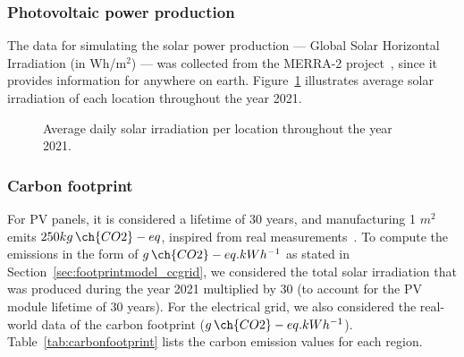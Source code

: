\subsubsection{Photovoltaic power production}

The data for simulating the solar power production --- Global Solar Horizontal Irradiation (in Wh/m$^{2}$) --- was collected from the MERRA-2 project~\cite{GELARO2017MERRA2}, since it provides information for anywhere on earth. Figure~\ref{fig:pv_ghi} illustrates average solar irradiation of each location throughout the year 2021.

 \begin{figure}[!htbp]
  \centering
   {}
  \caption{Average daily solar irradiation per location throughout the year 2021.}
  \label{fig:pv_ghi}
\end{figure}

\subsubsection{Carbon footprint}

For PV panels, it is considered a lifetime of 30 years, and manufacturing 1 $m^2$ emits $250 kg\,\ch{CO2}-eq$, inspired from real measurements~\cite{YUE2014pv_carbon}. To compute the emissions in the form of $g\,\ch{CO2}-eq.kWh^{-1}$ as stated in Section~\ref{sec:footprintmodel_ccgrid}, we considered the total solar irradiation that was produced during the year 2021 multiplied by 30 (to account for the PV module lifetime of 30 years). For the electrical grid, we also considered the real-world data of the carbon footprint ($g\,\ch{CO2}-eq.kWh^{-1}$). Table~\ref{tab:carbonfootprint} lists the carbon emission values for each region.

